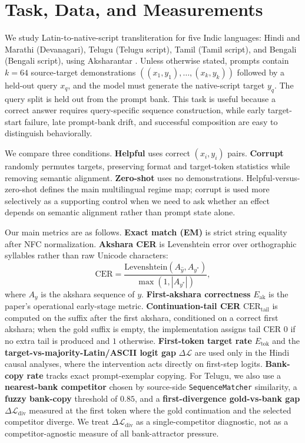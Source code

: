 \documentclass{article}
\begin{document}
\section{Task, Data, and Measurements}\label{sec:task}

We study Latin-to-native-script transliteration for five Indic languages: Hindi and Marathi (Devanagari), Telugu (Telugu script), Tamil (Tamil script), and Bengali (Bengali script), using Aksharantar \citep{aksharantar}. Unless otherwise stated, prompts contain $k{=}64$ source-target demonstrations $((x_1,y_1),\ldots,(x_k,y_k))$ followed by a held-out query $x_q$, and the model must generate the native-script target $y_q$. The query split is held out from the prompt bank. This task is useful because a correct answer requires query-specific sequence construction, while early target-start failure, late prompt-bank drift, and successful composition are easy to distinguish behaviorally.

We compare three conditions. \textbf{Helpful} uses correct $(x_i,y_i)$ pairs. \textbf{Corrupt} randomly permutes targets, preserving format and target-token statistics while removing semantic alignment. \textbf{Zero-shot} uses no demonstrations. Helpful-versus-zero-shot defines the main multilingual regime map; corrupt is used more selectively as a supporting control when we need to ask whether an effect depends on semantic alignment rather than prompt state alone.

Our main metrics are as follows. \textbf{Exact match (EM)} is strict string equality after NFC normalization. \textbf{Akshara CER} is Levenshtein error over orthographic syllables rather than raw Unicode characters:
\begin{equation}
\mathrm{CER} = \frac{\mathrm{Levenshtein}(A_{\hat y},A_{y^*})}{\max(1,|A_{y^*}|)},
\end{equation}
where $A_y$ is the akshara sequence of $y$. \textbf{First-akshara correctness} $E_{\mathrm{ak}}$ is the paper's operational early-stage metric. \textbf{Continuation-tail CER} $\mathrm{CER}_{\mathrm{tail}}$ is computed on the suffix after the first akshara, conditioned on a correct first akshara; when the gold suffix is empty, the implementation assigns tail CER $0$ if no extra tail is produced and $1$ otherwise. \textbf{First-token target rate} $E_{\mathrm{tok}}$ and the \textbf{target-vs-majority-Latin/ASCII logit gap} $\Delta \mathcal{L}$ are used only in the Hindi causal analyses, where the intervention acts directly on first-step logits. \textbf{Bank-copy rate} tracks exact prompt-exemplar copying. For Telugu, we also use a \textbf{nearest-bank competitor} chosen by source-side \texttt{SequenceMatcher} similarity, a \textbf{fuzzy bank-copy} threshold of $0.85$, and a \textbf{first-divergence gold-vs-bank gap} $\Delta \mathcal{L}_{\mathrm{div}}$ measured at the first token where the gold continuation and the selected competitor diverge. We treat $\Delta \mathcal{L}_{\mathrm{div}}$ as a single-competitor diagnostic, not as a competitor-agnostic measure of all bank-attractor pressure.
\end{document}
